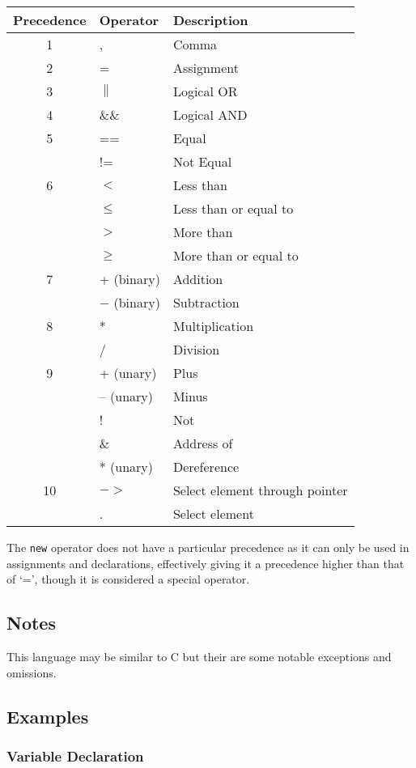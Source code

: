 \documentclass[a4paper,11pt]{article}
\begin{document}
\begin{tabular}{| c | l | l |}
\hline
Precedence & Operator & Description \\ \hline
1 & , & Comma \\ \hline
2 & = & Assignment \\ \hline
3 & $\parallel$ & Logical OR \\ \hline
4 & \&\& & Logical AND \\ \hline
5 & == & Equal \\
  & != & Not Equal \\ \hline
6 & $<$ & Less than \\
  & $\leq$ & Less than or equal to \\
  & $>$ & More than \\
  & $\geq$ & More than or equal to \\ \hline
7 & + (binary) & Addition \\
  & $-$ (binary) & Subtraction \\ \hline
8 & * & Multiplication \\
  & / & Division \\ \hline
9 & + (unary) & Plus \\
  & -- (unary) & Minus \\
  & ! & Not \\
  & $\&$ & Address of \\
  & * (unary) & Dereference \\ \hline
10 & $-$$>$ & Select element through pointer \\
   & . & Select element \\ \hline
\end{tabular}

The \verb+new+ operator does not have a particular precedence as it can only be used in assignments and declarations, effectively giving it a precedence higher than that of `=', though it is considered a special operator.

\subsection{Notes}

This language may be similar to C but their are some notable exceptions and omissions.


\subsection{Examples}

\subsubsection{Variable Declaration}
\end{document}
